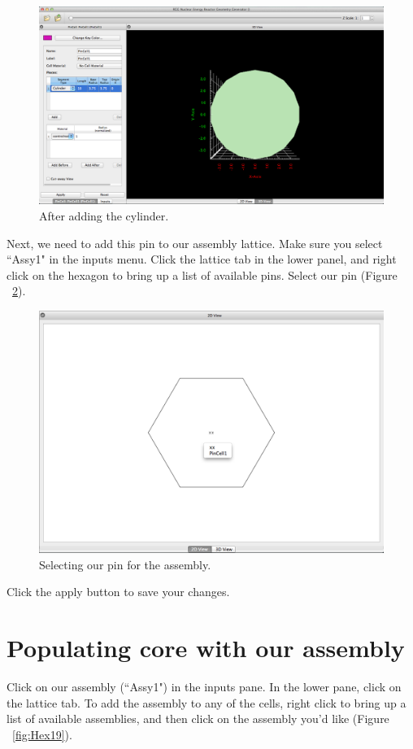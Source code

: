 \begin{figure}[H]
	\begin{center}
		\includegraphics[width=0.85\linewidth]{Images/hex-final-pin.png}
		\caption{After adding the cylinder.}
		\label{fig:Hex14}
	\end{center}
\end{figure}

Next, we need to add this pin to our assembly lattice.  Make sure you select ``Assy1" in the inputs menu.  Click the lattice tab in the lower panel, and right click on the hexagon to bring up a list of available pins.  Select our pin (Figure ~\ref{fig:Hex18}).

\begin{figure}[H]
	\begin{center}
		\includegraphics[width=0.5\linewidth]{Images/hex-set-pin.png}
		\caption{Selecting our pin for the assembly.}
		\label{fig:Hex18}
	\end{center}
\end{figure}

Click the apply button to save your changes.

\section{Populating core with our assembly}

Click on our assembly (``Assy1") in the inputs pane.  In the lower pane, click on the lattice tab.  To add the assembly to any of the cells, right click to bring up a list of available assemblies, and then click on the assembly you'd like (Figure ~\ref{fig:Hex19}).

